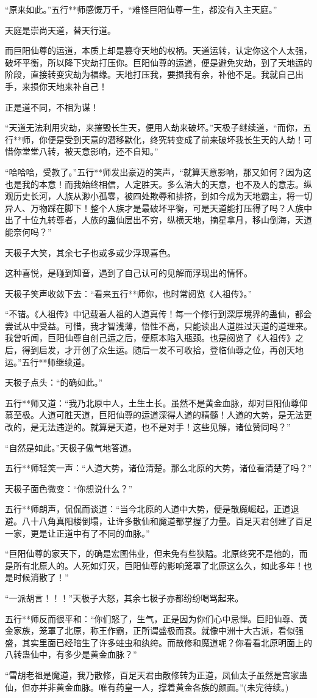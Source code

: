 \begin{this_body}
“原来如此。”五行**师感慨万千，“难怪巨阳仙尊一生，都没有入主天庭。”

天庭是崇尚天道，替天行道。

而巨阳仙尊的运道，本质上却是篡夺天地的权柄。天道运转，认定你这个人太强，破坏平衡，所以降下灾劫打压你。巨阳仙尊的运道，便是避免灾劫，到了天地运的阶段，直接转变灾劫为福缘。天地打压我，要损我有余，补他不足。我就自己出手，来损你天地来补自己！

正是道不同，不相为谋！

“天道无法利用灾劫，来摧毁长生天，便用人劫来破坏。”天极子继续道，“而你，五行**师，你便是受到天意的潜移默化，终究转变成了前来破坏我长生天的人劫！可惜你堂堂八转，被天意影响，还不自知。”

“哈哈哈，受教了。”五行**师发出豪迈的笑声，“就算天意影响，那又如何？因为这也是我的本意！而我始终相信，人定胜天。多么浩大的天意，也不及人的意志。纵观历史长河，人族从渺小孤零，被四处欺辱和排挤，到如今成为天地霸主，将一切异人、万物踩在脚下！整个人族才是最破坏平衡，可是天道能打压得了吗？人族中出了十位九转尊者，人族的蛊仙层出不穷，纵横天地，摘星拿月，移山倒海，天道能奈何吗？”

天极子大笑，其余七子也或多或少浮现喜色。

这种喜悦，是碰到知音，遇到了自己认可的见解而浮现出的情怀。

天极子笑声收敛下去：“看来五行**师你，也时常阅览《人祖传》。”

“不错。《人祖传》中记载着人祖的人道真传！每一个修行到深厚境界的蛊仙，都会尝试从中受益。可惜，我才智浅薄，悟性不高，只能读出人道胜过天道的道理来。我曾听闻，巨阳仙尊自创己运之后，便原本陷入瓶颈。也是阅览了《人祖传》之后，得到启发，才开创了众生运。随后一发不可收拾，登临仙尊之位，再创天地运。”五行**师继续道。

天极子点头：“的确如此。”

五行**师又道：“我乃北原中人，土生土长。虽然不是黄金血脉，却对巨阳仙尊仰慕至极。人道可胜天道，巨阳仙尊的运道深得人道的精髓！人道的大势，是无法更改的，是无法违逆的。就算是天道，也不是对手！这些见解，诸位赞同吗？”

“自然是如此。”天极子傲气地答道。

五行**师轻笑一声：“人道大势，诸位清楚。那么北原的大势，诸位看清楚了吗？”

天极子面色微变：“你想说什么？”

五行**师朗声，侃侃而谈道：“当今北原的人道中大势，便是散魔崛起，正道退避。八十八角真阳楼倒塌，让许多散仙和魔道都掌握了力量。百足天君创建了百足一家，更是让正道中有了不同的血脉。”

“巨阳仙尊的家天下，的确是宏图伟业，但未免有些狭隘。北原终究不是他的，而是所有北原人的。人死如灯灭，巨阳仙尊的影响笼罩了北原这么久，如此多年！也是时候消散了！”

“一派胡言！！！”天极子大怒，其余七极子亦都纷纷喝骂起来。

五行**师反而很平和：“你们怒了，生气，正是因为你们心中忌惮。巨阳仙尊、黄金家族，笼罩了北原，称王作霸，正所谓盛极而衰。就像中洲十大古派，看似强盛，其实里面已经暗生了许多蛀虫和纨绔。而散修和魔道呢？你看看北原明面上的八转蛊仙中，有多少是黄金血脉？”

“雪胡老祖是魔道，我乃散修，百足天君由散修转为正道，凤仙太子虽然是宫家蛊仙，但亦并非黄金血脉。唯有药皇一人，撑着黄金各族的颜面。”(未完待续。)

\end{this_body}

